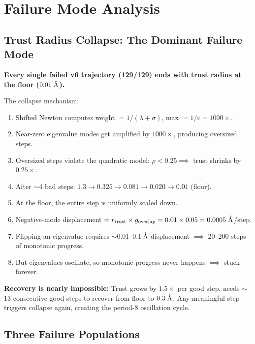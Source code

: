 \documentclass[11pt,a4paper]{article}
\newcommand{\eval}{\lambda}
\newcommand{\angstrom}{\text{\r{A}}}
\begin{document}
\section{Failure Mode Analysis}
\label{sec:failures}

\subsection{Trust Radius Collapse: The Dominant Failure Mode}
\label{sec:trust-collapse}

\textbf{Every single failed v6 trajectory (129/129) ends with trust radius at the floor ($0.01\;\angstrom$).}

The collapse mechanism:
\begin{enumerate}
  \item Shifted Newton computes weight $= 1/(\eval + \sigma)$, max $= 1/\varepsilon = 1000\times$.
  \item Near-zero eigenvalue modes get amplified by $1000\times$, producing oversized steps.
  \item Oversized steps violate the quadratic model: $\rho < 0.25 \implies$ trust shrinks by $0.25\times$.
  \item After $\sim$4 bad steps: $1.3 \to 0.325 \to 0.081 \to 0.020 \to 0.01$ (floor).
  \item At the floor, the entire step is uniformly scaled down.
  \item Negative-mode displacement $= r_\text{trust} \times g_\text{overlap} = 0.01 \times 0.05 = 0.0005\;\angstrom$/step.
  \item Flipping an eigenvalue requires $\sim$0.01--0.1\,$\angstrom$ displacement $\implies$ 20--200 steps of monotonic progress.
  \item But eigenvalues oscillate, so monotonic progress never happens $\implies$ stuck forever.
\end{enumerate}

\textbf{Recovery is nearly impossible:} Trust grows by $1.5\times$ per good step, needs $\sim$13 consecutive good steps to recover from floor to $0.3\;\angstrom$. Any meaningful step triggers collapse again, creating the period-8 oscillation cycle.

\subsection{Three Failure Populations}
\label{sec:failure-populations}
\end{document}
